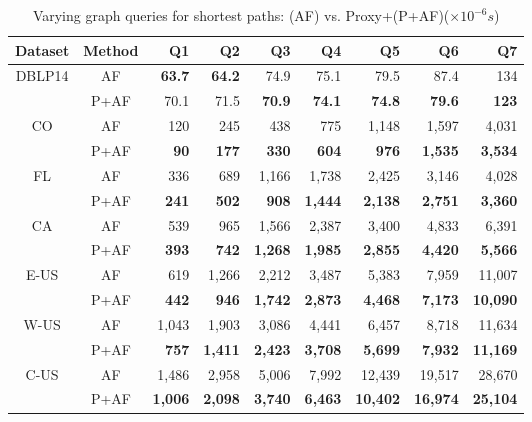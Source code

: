 \begin{table}[t!]
\label{tab:performance_path_queries_af}
\caption{Varying graph queries for shortest paths: \arcflag(AF) vs. Proxy+\arcflag(P+AF)($\times 10^{-6}s$)}
\vspace{-1ex}
\begin{center}
\begin{tabular}{|c|c|r|r|r|r|r|r|r|}
\hline

Dataset & Method & Q1 & Q2 & Q3 & Q4 & Q5 & Q6 &Q7  \\ \hline \hline
\multirow{2}{*}{DBLP14} & AF & {\bf63.7} & {\bf64.2} & 74.9 & 75.1 & 79.5 & 87.4 & 134 \\ \cline{2-9}
                       & P+AF& 70.1 & 71.5 & {\bf70.9} & {\bf74.1} & {\bf74.8} & {\bf79.6} & {\bf123} \\ \hline
\multirow{2}{*}{CO} & AF & 120 & 245 & 438 & 775 & 1,148 & 1,597 & 4,031 \\ \cline{2-9}
                  & P+AF & {\bf90} & {\bf177} & {\bf330} & {\bf604} & {\bf976} & {\bf1,535} & {\bf3,534} \\ \hline
\multirow{2}{*}{FL} & AF & 336 & 689 & 1,166 & 1,738 & 2,425 & 3,146 & 4,028 \\ \cline{2-9}
                  & P+AF & {\bf241} & {\bf502} & {\bf908} & {\bf1,444} & {\bf2,138} & {\bf2,751} & {\bf3,360} \\ \hline
\multirow{2}{*}{CA} & AF & 539 & 965 & 1,566 & 2,387 & 3,400 & 4,833 & 6,391 \\ \cline{2-9}
                  & P+AF & {\bf393} & {\bf742} & {\bf1,268} & {\bf1,985} & {\bf2,855} & {\bf4,420} & {\bf5,566} \\ \hline
\multirow{2}{*}{E-US}&AF & 619 & 1,266 & 2,212 & 3,487 & 5,383 & 7,959 & 11,007 \\ \cline{2-9}
                  & P+AF & {\bf442} & {\bf946} & {\bf1,742} & {\bf2,873} & {\bf4,468} & {\bf7,173} & {\bf10,090} \\ \hline
\multirow{2}{*}{W-US}&AF & 1,043 & 1,903 & 3,086 & 4,441 & 6,457 & 8,718 & 11,634 \\ \cline{2-9}
                  & P+AF & {\bf757} & {\bf1,411} & {\bf2,423} & {\bf3,708} & {\bf5,699} & {\bf7,932} & {\bf11,169} \\ \hline
\multirow{2}{*}{C-US}&AF & 1,486 & 2,958 & 5,006 & 7,992 & 12,439 & 19,517 & 28,670 \\ \cline{2-9}
                  & P+AF & {\bf1,006} & {\bf2,098} & {\bf3,740} & {\bf6,463} & {\bf10,402} & {\bf16,974} & {\bf25,104} \\ \hline
\end{tabular}
\end{center}
\end{table}

